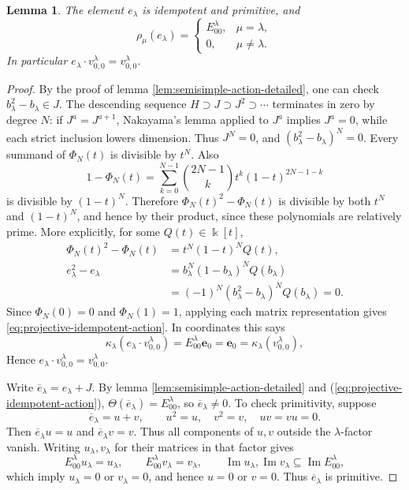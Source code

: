 \documentclass[10pt,oneside]{amsart}
\newcommand{\kk}{\Bbbk}
\newtheorem{lemma}[proposition]{Lemma}
\theoremstyle{definition}
\begin{document}
\begin{lemma}\label{lem:idempotent-lift-detailed}
The element $e_\lambda$ is idempotent and primitive, and
\begin{equation}\label{eq:projective-idempotent-action}
 \rho_\mu(e_\lambda)=
 \begin{cases}E_{00}^\lambda,&\mu=\lambda,\\0,&\mu\ne\lambda.
 \end{cases}
\end{equation}
In particular $e_\lambda\cdot v_{0,0}^\lambda=v_{0,0}^\lambda$.
\end{lemma}
\begin{proof}
By the proof of lemma \ref{lem:semisimple-action-detailed}, one can check $b_\lambda^2-b_\lambda\in J$.
The descending sequence $H\supset J\supset J^2\supset\cdots$ terminates
in zero by degree $N$: if $J^a=J^{a+1}$, Nakayama's lemma applied to
$J^a$ implies $J^a=0$, while each strict inclusion lowers dimension.
Thus $J^N=0$, and $(b_\lambda^2-b_\lambda)^N=0$.
Every summand of $\Phi_N(t)$ is divisible by $t^N$. Also
\[
 1-\Phi_N(t)=\sum_{k=0}^{N-1}\binom{2N-1}{k}
                 t^k(1-t)^{2N-1-k}
\]
is divisible by $(1-t)^N$. Therefore
$\Phi_N(t)^2-\Phi_N(t)$ is divisible by both $t^N$ and $(1-t)^N$,
and hence by their product, since these polynomials are relatively prime.
More explicitly, for some $Q(t)\in\kk[t]$,
\begin{align*}
 \Phi_N(t)^2-\Phi_N(t)&=t^N(1-t)^NQ(t),\\
 e_\lambda^2-e_\lambda
 &=b_\lambda^N(1-b_\lambda)^NQ(b_\lambda)\\
 &=(-1)^N(b_\lambda^2-b_\lambda)^NQ(b_\lambda)=0.
\end{align*}
Since $\Phi_N(0)=0$ and $\Phi_N(1)=1$, applying each matrix
representation gives \eqref{eq:projective-idempotent-action}.
In coordinates this says
\[
 \kappa_\lambda(e_\lambda\cdot v_{0,0}^\lambda)
 =E_{00}^\lambda\mathbf e_0=\mathbf e_0
 =\kappa_\lambda(v_{0,0}^\lambda),
\]
Hence $e_\lambda\cdot v_{0,0}^\lambda=v_{0,0}^\lambda$.

Write $\overline e_\lambda=e_\lambda+J$. By lemma \ref{lem:semisimple-action-detailed} and (\ref{eq:projective-idempotent-action}), $\Theta(\overline e_\lambda)=E_{00}^\lambda$, so
$\overline e_\lambda\ne0$. To check primitivity, suppose
\[
 \overline e_\lambda=u+v,\qquad u^2=u,\quad v^2=v,\quad uv=vu=0.
\]
Then $\overline e_\lambda u=u$ and $\overline e_\lambda v=v$.
Thus all components of $u,v$ outside the $\lambda$-factor vanish.
Writing $u_\lambda,v_\lambda$ for their matrices in that factor gives
\[
 E_{00}^\lambda u_\lambda=u_\lambda,\qquad
 E_{00}^\lambda v_\lambda=v_\lambda,
 \qquad
 \operatorname{Im}u_\lambda,\operatorname{Im}v_\lambda
 \subseteq\operatorname{Im}E_{00}^\lambda,
\] which imply $ u_\lambda=0$ or $ v_\lambda=0$, and hence
 $u=0$ or $v=0$. Thus $\overline e_\lambda$ is primitive.


\end{proof}
\end{document}
